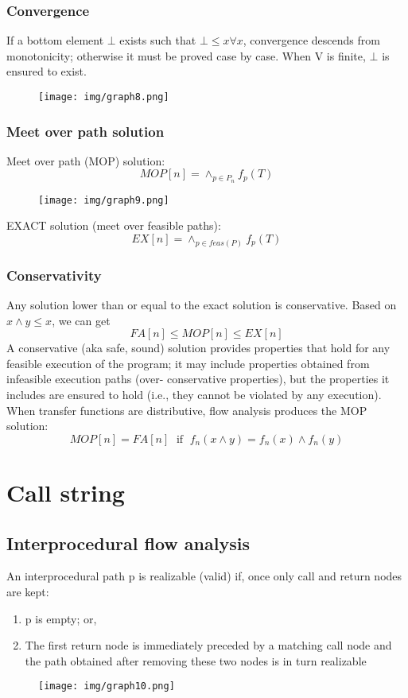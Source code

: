\documentclass[a4paper, 10pt, titlepage]{article}
\begin{document}
\subsubsection{Convergence}
If a bottom element $\bot$ exists such that $\bot \leq x \forall x$, convergence
descends from monotonicity; otherwise it must be proved case
by case. When V is finite, $\bot$ is ensured to exist.
\begin{figure}[h]
\centering
\texttt{[image: img/graph8.png]}
\end{figure}

\subsubsection{Meet over path solution}
Meet over path (MOP) solution:
$$MOP[n] = \wedge_{p \in P_n} f_p(T)$$
\begin{figure}[h]
\centering
\texttt{[image: img/graph9.png]}
\end{figure}
EXACT solution (meet over feasible paths):
$$EX[n]=\wedge_{p \in feas(P)} f_p(T)$$

\subsubsection{Conservativity}
Any solution lower than or equal to the exact solution is conservative. Based on $x \wedge y \leq x$, we can get
$$FA[n] \leq MOP[n] \leq EX[n]$$
A conservative (aka safe, sound) solution provides properties that hold for any feasible execution of the program; it may include properties obtained from infeasible execution paths (over- conservative properties), but the properties it includes are ensured to hold (i.e., they cannot be violated by any execution). When transfer functions are distributive, flow analysis produces the MOP solution:
$$MOP[n] = FA[n] \;\text{ if }\; f_n(x \wedge y) = f_n(x) \wedge f_n(y)$$

\section{Call string}
\subsection{Interprocedural flow analysis}
An interprocedural path p is realizable (valid) if, once only call and return nodes are kept:
\begin{enumerate}
\item p is empty; or,
\item The first return node is immediately preceded by a matching call node and the path obtained after removing these two nodes is in turn realizable
\end{enumerate}
\begin{figure}[h]
\centering
\texttt{[image: img/graph10.png]}
\end{figure}
\end{document}
